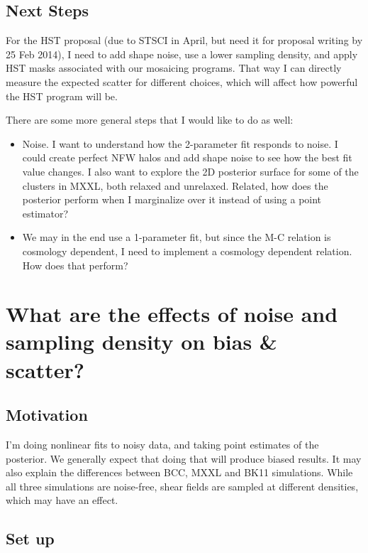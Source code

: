 \documentclass[11pt]{article}
\begin{document}
\subsection{Next Steps}

For the HST proposal (due to STSCI in April, but need it for proposal writing by 25 Feb 2014), I need to add shape noise, use a lower sampling density, and apply HST masks associated with our mosaicing programs. That way I can directly measure the expected scatter for different choices, which will affect how powerful the HST program will be. 

There are some more general steps that I would like to do as well:
\begin{itemize}
\item Noise. I want to understand how the 2-parameter fit responds to noise. I could create perfect NFW halos and add shape noise to see how the best fit value changes. I also want to explore the 2D posterior surface for some of the clusters in MXXL, both relaxed and unrelaxed. Related, how does the posterior perform when I marginalize over it instead of using a point estimator?
\item We may in the end use a 1-parameter fit, but since the M-C relation is cosmology dependent, I need to implement a cosmology dependent relation. How does that perform?
\end{itemize}

\section{What are the effects of noise and sampling density on bias \& scatter?}
\label{sec:noisebias}

\subsection{Motivation}
I'm doing nonlinear fits to noisy data, and taking point estimates of the posterior. We generally expect that doing that will produce biased results. It may also explain the differences between BCC, MXXL and BK11 simulations. While all three simulations are noise-free, shear fields are sampled at different densities, which may have an effect.

\subsection{Set up}
\end{document}
